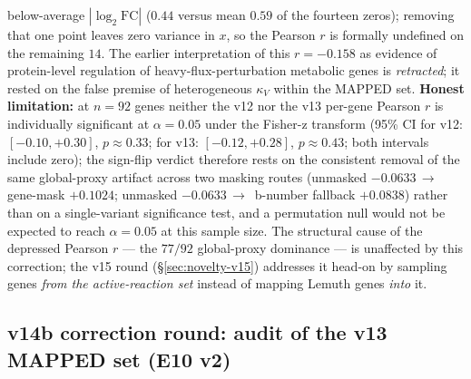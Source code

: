\documentclass[11pt,a4paper]{article}
\theoremstyle{plain}
\theoremstyle{definition}
\theoremstyle{remark}
\begin{document}
below-average $|\log_2 \mathrm{FC}|$ ($0.44$ versus mean $0.59$ of the
fourteen zeros); removing that one point leaves zero variance in $x$,
so the Pearson $r$ is formally undefined on the remaining $14$. The
earlier interpretation of this $r = -0.158$ as evidence of protein-level
regulation of heavy-flux-perturbation metabolic genes is
\emph{retracted}; it rested on the false premise of heterogeneous
$\kappa_V$ within the MAPPED set. \textbf{Honest limitation:} at $n=92$
genes neither the v12 nor the v13 per-gene Pearson $r$ is individually
significant at $\alpha=0.05$ under the Fisher-z transform (95\% CI for
v12: $[-0.10, +0.30]$, $p \approx 0.33$; for v13: $[-0.12, +0.28]$,
$p \approx 0.43$; both intervals include zero); the sign-flip verdict
therefore rests on the consistent removal of the same global-proxy
artifact across two masking routes (unmasked $-0.0633 \,\to\,$
gene-mask $+0.1024$; unmasked $-0.0633 \,\to\,$ b-number fallback
$+0.0838$) rather than on a single-variant significance test, and a
permutation null would not be expected to reach $\alpha=0.05$ at this
sample size. The structural cause of the depressed Pearson $r$ --- the
$77/92$ global-proxy dominance --- is unaffected by this correction;
the v15 round (\S\ref{sec:novelty-v15}) addresses it head-on by
sampling genes \emph{from the active-reaction set} instead of mapping
Lemuth genes \emph{into} it.

\subsection{v14b correction round: audit of the v13 MAPPED set
(E10 v2)}\label{sec:novelty-v14b}
\end{document}
